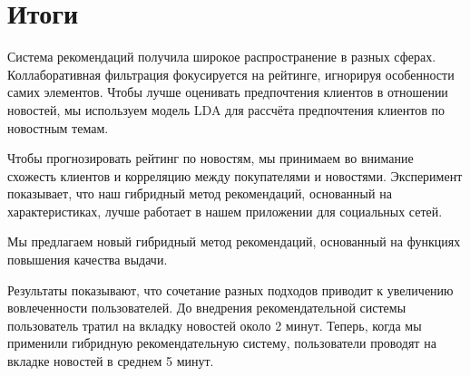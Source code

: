\documentclass[14pt]{matmex-diploma-custom}
\begin{document}



\section{Итоги}
\label{sec:summary}


Система рекомендаций получила широкое распространение в разных сферах. Коллаборативная фильтрация фокусируется на рейтинге, игнорируя особенности самих элементов. Чтобы лучше оценивать предпочтения клиентов в отношении новостей, мы используем модель LDA для рассчёта предпочтения клиентов по новостным темам.

Чтобы прогнозировать рейтинг по новостям, мы принимаем во внимание схожесть клиентов и корреляцию между покупателями и новостями. Эксперимент показывает, что наш гибридный метод рекомендаций, основанный на характеристиках, лучше работает в нашем приложении для социальных сетей.

Мы предлагаем новый гибридный метод рекомендаций, основанный на функциях повышения качества выдачи.

Результаты показывают, что сочетание разных подходов приводит к увеличению вовлеченности пользователей. До внедрения рекомендательной системы пользователь тратил на вкладку новостей около 2 минут. Теперь, когда мы применили гибридную рекомендательную систему, пользователи проводят на вкладке новостей в среднем 5 минут.



\setmonofont[Mapping=tex-text]{CMU Typewriter Text}


\end{document}
